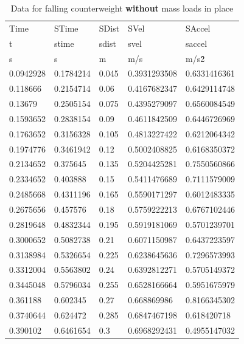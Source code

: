 \documentclass[coverpage]{article}
\begin{document}
	\begin{table}[!ht] \label{table:with-masses-table}
		\caption{Data for falling counterweight \textbf{without} mass loads in place}
		\vspace{.1in}
		
		\centering
		\begin{tabular}{|l|l|l|l|l|}
			Time & STime & SDist & SVel & SAccel \\
			t & stime & sdist & svel & saccel \\ \hline
			s & s & m & m/s & m/s\^2 \\ \hline
			0.0942928 & 0.1784214 & 0.045 & 0.3931293508 & 0.6331416361 \\ \hline
			0.118666 & 0.2154714 & 0.06 & 0.4167682347 & 0.6429114748 \\ \hline
			0.13679 & 0.2505154 & 0.075 & 0.4395279097 & 0.6560084549 \\ \hline
			0.1593652 & 0.2838154 & 0.09 & 0.4611842509 & 0.6446726969 \\ \hline
			0.1763652 & 0.3156328 & 0.105 & 0.4813227422 & 0.6212064342 \\ \hline
			0.1974776 & 0.3461942 & 0.12 & 0.5002408825 & 0.6168350372 \\ \hline
			0.2134652 & 0.375645 & 0.135 & 0.5204425281 & 0.7550560866 \\ \hline
			0.2334652 & 0.403888 & 0.15 & 0.5411476689 & 0.7111579009 \\ \hline
			0.2485668 & 0.4311196 & 0.165 & 0.5590171297 & 0.6012483335 \\ \hline
			0.2675656 & 0.457576 & 0.18 & 0.5759222213 & 0.6767102446 \\ \hline
			0.2819648 & 0.4832344 & 0.195 & 0.5919181069 & 0.5701239701 \\ \hline
			0.3000652 & 0.5082738 & 0.21 & 0.6071150987 & 0.6437223597 \\ \hline
			0.3138984 & 0.5326654 & 0.225 & 0.6238645636 & 0.7296573993 \\ \hline
			0.3312004 & 0.5563802 & 0.24 & 0.6392812271 & 0.5705149372 \\ \hline
			0.3445048 & 0.5796034 & 0.255 & 0.6528166664 & 0.5951675979 \\ \hline
			0.361188 & 0.602345 & 0.27 & 0.668869986 & 0.8166345302 \\ \hline
			0.3740644 & 0.624472 & 0.285 & 0.6847467198 & 0.618420718 \\ \hline
			0.390102 & 0.6461654 & 0.3 & 0.6968292431 & 0.4955147032 \\ \hline

\end{tabular}
\end{table}
\end{document}

